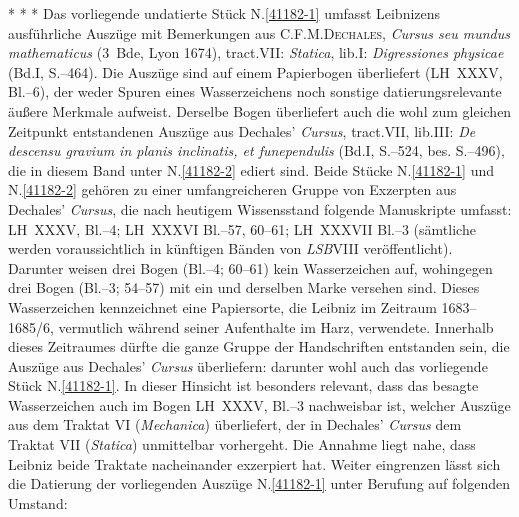 \pend%
\vspace{2.5em}%
\pstart%
\noindent%
\centering%
*     *     *
\pend%
\vspace{3.0em}%
%
\frenchspacing%
\footnotesize%
\pstart%
\noindent%
%
Das vorliegende undatierte Stück N.\;\ref{41182-1} umfasst Leibnizens ausführliche Auszüge mit Bemerkungen aus \textsc{C.\:F.\:M.\;Dechales}, \textit{Cursus seu mundus mathematicus} (3~Bde, Lyon 1674), tract.\;VII: \textit{Statica}, lib.\;I: \textit{Digressiones physicae} (Bd.\;I, S.--464).\cite{00124}
Die Auszüge sind auf einem Papierbogen überliefert (LH~XXXV, Bl.--6), der weder Spuren eines Wasserzeichens noch sonstige datierungsrelevante äußere Merkmale aufweist.
Derselbe Bogen überliefert auch die wohl zum gleichen Zeitpunkt entstandenen Auszüge aus Dechales' \textit{Cursus}, tract.\;VII, lib.\;III: \textit{De descensu gravium in planis inclinatis, et funependulis} (Bd.\;I, S.--524, bes. S.--496), die in diesem Band unter N.\;\ref{41182-2} ediert sind.
Beide Stücke N.\;\ref{41182-1} und N.\;\ref{41182-2} gehören zu einer umfangreicheren Gruppe von Exzerpten aus Dechales' \textit{Cursus},\cite{00124} die nach heutigem Wissensstand folgende Manuskripte umfasst:
LH~XXXV, Bl.--4; %
LH~XXXVI Bl.--57, 60--61; %
LH~XXXVII Bl.--3 %
(sämtliche werden voraussichtlich in künftigen Bänden von \textit{LSB}\;VIII veröffentlicht).
Darunter weisen drei Bogen (Bl.--4; 60--61) kein Wasserzeichen auf, wohingegen drei Bogen (Bl.--3; 54--57) mit ein und derselben Marke versehen sind.
Dieses Wasserzeichen kennzeichnet eine Papiersorte, die Leibniz im Zeitraum 1683--1685/6, vermutlich während seiner Aufenthalte im Harz, verwendete.
Innerhalb dieses Zeitraumes dürfte die ganze Gruppe der Handschriften entstanden sein, die Auszüge aus Dechales' \textit{Cursus} überliefern: darunter wohl auch das vorliegende Stück N.\;\ref{41182-1}.
In dieser Hinsicht ist besonders relevant, dass das besagte Wasserzeichen auch im Bogen LH~XXXV, Bl.--3 nachweisbar ist, welcher Auszüge aus dem Traktat VI (\textit{Mechanica}) überliefert, der in Dechales' \textit{Cursus}\cite{00124} dem Traktat VII (\textit{Statica}) unmittelbar vorhergeht.
Die Annahme liegt nahe, dass Leibniz beide Traktate nacheinander exzerpiert hat.
\pend%
\pstart%
Weiter eingrenzen lässt sich die Datierung der vorliegenden Auszüge N.\;\ref{41182-1} unter Berufung auf folgenden Umstand:
